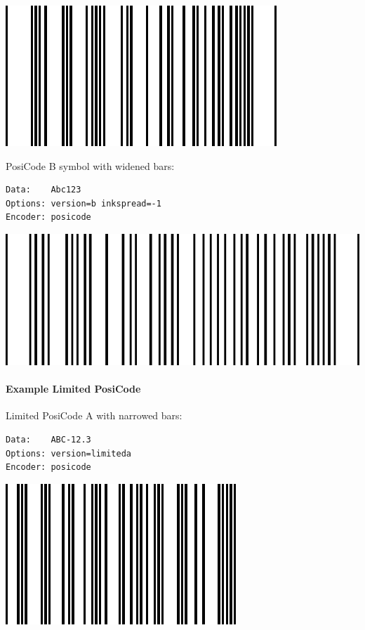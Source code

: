 \includegraphics{images/posicode-3.eps}

PosiCode B symbol with widened bars:

\begin{verbatim}
Data:    Abc123
Options: version=b inkspread=-1
Encoder: posicode
\end{verbatim}

\includegraphics{images/posicode-4.eps}

\hypertarget{example-limited-posicode}{%
\paragraph{Example Limited PosiCode}\label{example-limited-posicode}}

Limited PosiCode A with narrowed bars:

\begin{verbatim}
Data:    ABC-12.3
Options: version=limiteda
Encoder: posicode
\end{verbatim}

\includegraphics{images/posicode-5.eps}

